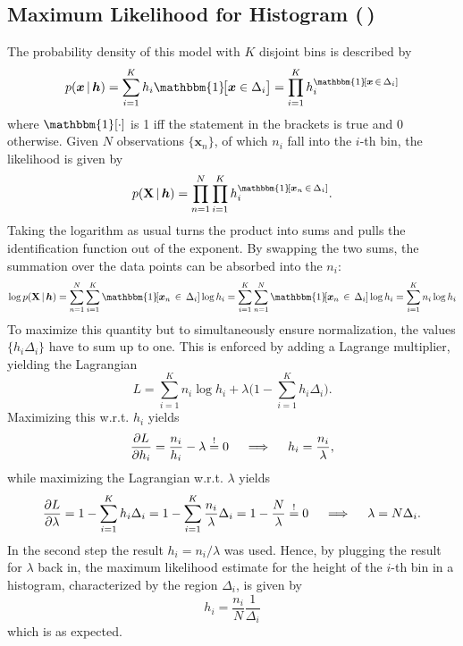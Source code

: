 \documentclass[11pt, a4paper]{scrartcl}
\renewcommand{\vec}[1]{\bm{#1}}
\newcommand{\mat}[1]{\bm{\mathrm{#1}}}
\newcommand{\given}{\,\vert\,}
\newcommand{\diffstar}{\texorpdfstring{\raisebox{-1pt}{\resizebox{!}{8pt}{\(\star\)}}}{*}}
\newcommand{\twostar}  {(\diffstar\,\diffstar)}
\begin{document}
		\subsection{Maximum Likelihood for Histogram  \twostar}
			The probability density of this model with \(K\) disjoint bins is described by
			\begin{equation}
				p(\vec{x} \given \vec{h})
					= \sum_{i = 1}^{K} h_i \mathbbm{1}\!\big[ \vec{x} \in \Delta_i \big]
					= \prod_{i = 1}^{K} h_i^{ \mathbbm{1}\![\vec{x} \,\in\, \Delta_i] }
			\end{equation}
			where \( \mathbbm{1}[\cdot] \) is \num{1} iff the statement in the brackets is true and \num{0} otherwise. Given \(N\) observations \( \{ \vec{x}_n \} \), of which \( n_i \) fall into the \(i\)-th bin, the likelihood is given by
			\begin{equation}
				p(\mat{X} \given \vec{h})
					= \prod_{n = 1}^{N} \prod_{i = 1}^{K} h_i^{ \mathbbm{1}\![\vec{x}_n \,\in\, \Delta_i] }.
			\end{equation}
			Taking the logarithm as usual turns the product into sums and pulls the identification function out of the exponent. By swapping the two sums, the summation over the data points can be absorbed into the \(n_i\):
			\begin{equation}
				\log p(\mat{X} \given \vec{h})
					= \sum_{n = 1}^{N} \sum_{i = 1}^{K} \mathbbm{1}\![\vec{x}_n \,\in\, \Delta_i] \log h_i
					= \sum_{i = 1}^{K} \sum_{n = 1}^{N} \mathbbm{1}\![\vec{x}_n \,\in\, \Delta_i] \log h_i
					= \sum_{i = 1}^{K} n_i \log h_i
			\end{equation}
			To maximize this quantity but to simultaneously ensure normalization, the values \( \{ h_i \Delta_i \} \) have to sum up to one. This is enforced by adding a Lagrange multiplier, yielding the Lagrangian
			\begin{equation}
				L = \sum_{i = 1}^{K} n_i \log h_i + \lambda \Bigg(\! 1 - \sum_{i = 1}^{K} h_i \Delta_i \!\Bigg)\!.
			\end{equation}
			Maximizing this w.r.t. \(h_i\) yields
			\begin{equation}
				\pdv{L}{h_i}
					= \frac{n_i}{h_i} - \lambda
					\overset{!}{=} 0
				\quad\implies\quad
					h_i = \frac{n_i}{\lambda},
			\end{equation}
			while maximizing the Lagrangian w.r.t. \(\lambda\) yields
			\begin{equation}
				\pdv{L}{\lambda}
					= 1 - \sum_{i = 1}^{K} h_i \Delta_i
					= 1 - \sum_{i = 1}^{K} \frac{n_i}{\lambda} \Delta_i
					= 1 - \frac{N}{\lambda}
					\overset{!}{=} 0
				\quad\implies\quad
					\lambda = N \Delta_i.
			\end{equation}
			In the second step the result \( h_i = n_i/\lambda \) was used. Hence, by plugging the result for \(\lambda\) back in, the maximum likelihood estimate for the height of the \(i\)-th bin in a histogram, characterized by the region \(\Delta_i\), is given by
			\begin{equation}
				h_i = \frac{n_i}{N} \frac{1}{\Delta_i}
			\end{equation}
			which is as expected.
\end{document}
